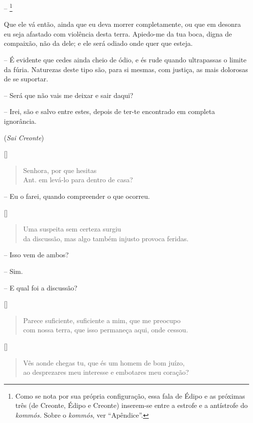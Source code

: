  -- \footnote{Como se nota por sua própria configuração, essa
  fala de Édipo e as próximas três (de Creonte, Édipo e Creonte)
  inserem-se entre a estrofe e a antístrofe do \emph{kommós.} Sobre o
  \emph{kommós}, ver ``Apêndice''.}

Que ele vá então, ainda que eu deva morrer completamente, ou que em
desonra  eu seja afastado com violência desta terra. Apiedo-me da
tua boca, digna de compaixão, não da dele; e ele será odiado onde quer
que esteja.

 --   É evidente que cedes ainda cheio de ódio, e és rude quando ultrapassas o
limite da fúria. Naturezas deste tipo são, para si mesmas, com justiça,
as mais dolorosas de se suportar.

 --   Será que não vais me deixar e sair daqui?

 --   Irei, são e salvo entre estes, depois de ter-te encontrado em completa
ignorância.

(\emph{Sai Creonte})


\hfill [] 

\begin{verse}Senhora, por que hesitas\\ Ant.
em levá-lo para dentro de casa?
\end{verse}

 --   Eu o farei, quando compreender o que ocorreu. 


\hfill [] 

\begin{verse}Uma suspeita sem certeza surgiu\\
da discussão, mas algo também injusto provoca feridas.
\end{verse}

 --   Isso vem de ambos?

 --   Sim.

 --   E qual foi a discussão?


\hfill [] 

\begin{verse}Parece suficiente, suficiente a mim, que me preocupo\\
com nossa terra, que isso permaneça aqui, onde cessou.
\end{verse}

\hfill [] 

\begin{verse}Vês aonde chegas tu, que és um homem de bom juízo,\\
ao desprezares meu interesse e embotares meu coração?
\end{verse}


